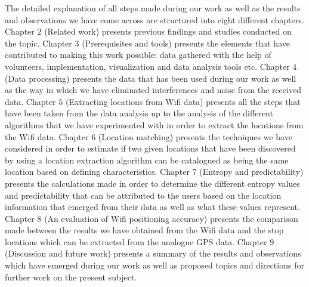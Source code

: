 The detailed explanation of all steps made during our work as well as the
results and observations we have come across are structured into eight different
chapters. Chapter $2$ (Related work) presents previous findings and studies
conducted on the topic. Chapter $3$ (Prerequisites and tools) presents the
elements that have contributed to making this work possible: data gathered with
the help of volunteers, implementation, visualization and data analysis tools
etc. Chapter $4$ (Data processing) presents the data that has been used during
our work as well as the way in which we have eliminated interferences and noise
from the received data. Chapter $5$ (Extracting locations from Wifi data)
presents all the steps that have been taken from the data analysis up to the
analysis of the different algorithms that we have experimented with in order to
extract the locations from the Wifi data. Chapter $6$ (Location matching)
presents the techniques we have considered in order to estimate if two given
locations that have been discovered by using a location extraction algorithm can
be catalogued as being the same location based on defining characteristics.
Chapter $7$ (Entropy and predictability) presents the calculations made in order
to determine the different entropy values and predictability that can be
attributed to the users based on the location information that emerged from
their data as well as what these values represent. Chapter $8$ (An evaluation
of Wifi positioning accuracy) presents the comparison made between the results
we have obtained from the Wifi data and the stop locations which can be
extracted from the analogue GPS data. Chapter $9$ (Discussion and future work)
presents a summary of the results and observations which have emerged during
our work as well as proposed topics and directions for further work on the
present subject.
